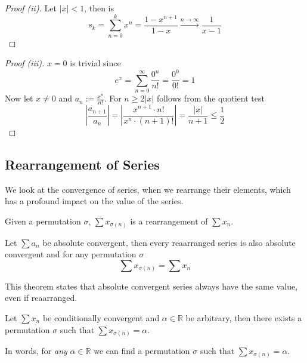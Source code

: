 \begin{proof}[Proof (ii)]
   Let \(|x| < 1 \), then is
   \[s_k = \sum_{n = 0}^k x^n = \frac{1 - x^{n+1}}{1 - x} \xrightarrow{n \to \infty} \frac{1}{x-1}\]
\end{proof}
\begin{proof}[Proof (iii)]
   \(x = 0\) is trivial since
   \[e^x = \sum_{n=0}^\infty \frac{0^n}{n!} = \frac{0^0}{0!} = 1\]
   Now let \(x \neq 0\) and \(a_n := \frac{x^n}{n!}\).
   For \(n \geq 2\lvert x\rvert\) follows from the quotient test
   \[\left\lvert \frac{a_{n+1}}{a_n} \right\rvert = \left\lvert \frac{x^{n+1} \cdot n!}{x^n \cdot (n+1)!}\right\rvert = \frac{\lvert x\rvert}{n+1} \leq \frac{1}{2}\]
\end{proof}

\subsection{Rearrangement of Series}
We look at the convergence of series, when we rearrange their elements, which has a profound impact on the value of the series.
\begin{definition}
   Given a permutation \(\sigma\), \(\sum x_{\sigma(n)}\) is a rearrangement of \(\sum x_n\).
\end{definition}

\begin{theorem}\label{thm:rearrange_series}
   Let \(\sum a_n\) be absolute convergent, then every reaarranged series is also absolute convergent and for any permutation \(\sigma\)
   \[\sum x_{\sigma(n)} = \sum x_n\]
\end{theorem}
\begin{remark}
   This theorem states that absolute convergent series always have the same value, even if reaarranged.
\end{remark}

\begin{proposition}\label{pro:riemann_rearrang}
   Let \(\sum x_n\) be conditionally convergent and \(\alpha \in \mathbb{R}\) be arbitrary, then there exists a permutation \(\sigma\) such that \(\sum x_{\sigma(n)} = \alpha\).
\end{proposition}
\begin{remark}[Intuition]
   In words, for \emph{any} \(\alpha \in \mathbb{R}\) we can find a permutation \(\sigma\) such that \(\sum x_{\sigma(n)} = \alpha\).
\end{remark}

